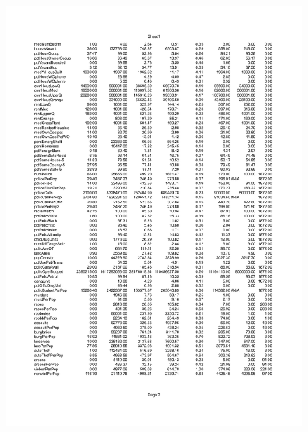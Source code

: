 \documentclass[a4paper,10pt]{article}
\begin{document}
\begin{figure}
\centering
\includegraphics[h, width=1.3\textwidth]{sumstat2.pdf}
\end{figure}



\newpage


\end{document}
